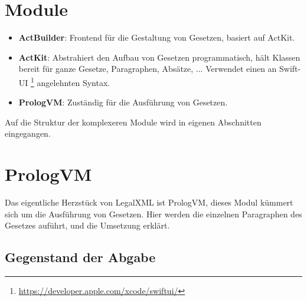 \documentclass[8pt]{article}
\begin{document}
\section{Module}
\begin{itemize}
    \item \textbf{ActBuilder}: Frontend für die Gestaltung von Gesetzen, basiert auf ActKit.
    \item \textbf{ActKit}: Abstrahiert den Aufbau von Gesetzen programmatisch, hält Klassen bereit für ganze Gesetze, Paragraphen, Absätze, ...
             Verwendet einen an Swift-UI \footnote{\url{https://developer.apple.com/xcode/swiftui/}} angelehnten Syntax.
    \item \textbf{PrologVM}: Zuständig für die Ausführung von Gesetzen.
\end{itemize}

Auf die Struktur der komplexeren Module wird in eigenen Abschnitten eingegangen.

\section{PrologVM}
Das eigentliche Herzstück von LegalXML ist PrologVM, dieses Modul kümmert sich um die Ausführung von Gesetzen.
Hier werden die einzelnen Paragraphen des Gesetzes auführt, und die Umsetzung erklärt.

\subsection{Gegenstand der Abgabe}
\end{document}
